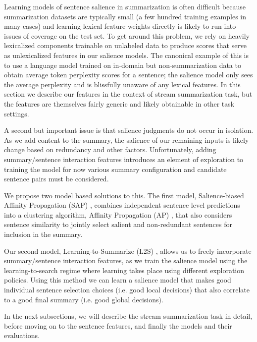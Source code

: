 Learning models of sentence salience in summarization is often difficult
because summarization datasets are typically small (a few hundred training
examples in many cases) and learning lexical 
feature weights directly is likely to run into issues of coverage on the test
set. To get around this problem, we rely on heavily lexicalized components 
trainable on unlabeled data to produce scores that serve as unlexicalized 
features in our salience models. The canonical example of this is to use 
a language model trained on in-domain but non-summarization data to 
obtain average token perplexity scores for a sentence; the salience model
only sees the average perplexity and is blissfully unaware of any lexical 
features. 
In this section we 
describe our features in the context of stream summarization task, but the 
features are themselves fairly generic and likely obtainable in other task
settings.

A second but important issue is that salience judgments do not occur
in isolation. As we add content to the summary, the salience
of our remaining inputs is likely change based on redundancy and other factors.
Unfortunately, adding summary/sentence interaction features introduces an element of 
exploration to training the model for now various summary configuration 
and candidate sentence pairs must be considered.

We propose two model based solutions to this. 
The first model, Salience-biased Affinity Propagation (SAP) 
\citep{kedzie2015predicting}, combines 
independent sentence level predictions into a clustering algorithm,
Affinity Propagation (AP) \citep{frey2007clustering}, that also 
considers sentence similarity to jointly select salient and 
non-redundant sentences for inclusion in the summary.

Our second model, Learning-to-Summarize (L2S) \citep{kedzie2016real}, allows 
us to freely incorporate summary/sentence interaction
features, as we train the salience model using the learning-to-search regime
\cite{daume2009search,chang2015learning}
where learning takes place using different exploration policies. Using 
this method we can learn a salience model that makes good individual sentence
selection choices (i.e. good local decisions) that also correlate to a good 
final summary (i.e. good global decisions). 

In the next subsections, we will describe the stream summarization task
in detail, before moving on to the sentence features, and finally the models
and their evaluations.


